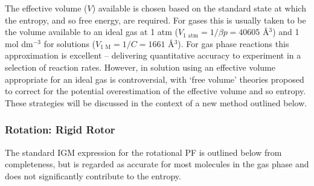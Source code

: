 \documentclass[../main.tex]{subfiles}
\begin{document}
%

The effective volume ($V$) available is chosen based on the standard state at which the entropy, and so free energy, are required.\cite{Zhou2009} For gases this is usually taken to be the volume available to an ideal gas at 1 atm ($V_\text{1 atm} = 1 / \beta p= 40605$ \AA${}^3$) and 1 mol dm${}^{-3}$ for solutions ($V_\text{1 M} = 1/ C =  1661$ \AA${}^3$). For gas phase reactions this approximation is excellent -- delivering quantitative accuracy to experiment in a selection of reaction rates.\cite{Shan2019} However, in solution using an effective volume appropriate for an ideal gas is controversial, with `free volume' theories proposed to correct for the potential overestimation of the effective volume and so entropy.\cite{Amzel1997} These strategies will be discussed in the context of a new method outlined below.

\subsubsection{Rotation: Rigid Rotor}

The standard IGM expression for the rotational PF is outlined below from completeness, but is regarded as accurate for most molecules in the gas phase and does not significantly contribute  to the entropy.



\end{document}
